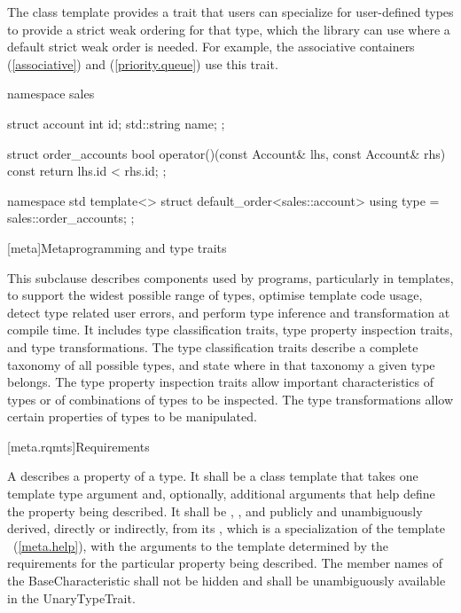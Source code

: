 \pnum
The class template  provides a trait that users can
specialize for user-defined types to provide a strict weak ordering for that
type, which the library can use where a default strict weak order is needed.
For example, the associative containers (\ref{associative}) and
 (\ref{priority.queue}) use this trait.

\pnum
\begin{example}
\begin{codeblock}
namespace sales {
  struct account {
    int id;
    std::string name;
  };

  struct order_accounts {
    bool operator()(const Account& lhs, const Account& rhs) const {
      return lhs.id < rhs.id;
    }
  };
}

namespace std {
  template<>
  struct default_order<sales::account> {
    using type = sales::order_accounts;
  };
}
\end{codeblock}
\end{example}

[meta]{Metaprogramming and type traits}

\pnum
This subclause describes components used by \Cpp programs, particularly in
templates, to support the widest possible range of types, optimise
template code usage, detect type related user errors, and perform
type inference and transformation at compile time. It includes type
classification traits, type property inspection traits, and type
transformations. The type classification traits describe a complete taxonomy
of all possible \Cpp types, and state where in that taxonomy a given
type belongs. The type property inspection traits allow important
characteristics of types or of combinations of types to be inspected. The
type transformations allow certain properties of types to be manipulated.

[meta.rqmts]{Requirements}

\pnum
A  describes a property
of a type. It shall be a class template that takes one template type
argument and, optionally, additional arguments that help define the
property being described. It shall be ,
,
and publicly and unambiguously derived, directly or indirectly, from
its , which is
a specialization of the template
~(\ref{meta.help}), with
the arguments to the template  determined by the
requirements for the particular property being described.
The member names of the BaseCharacteristic shall not be hidden and shall be
unambiguously available in the UnaryTypeTrait.

